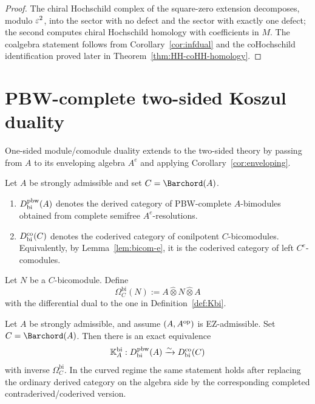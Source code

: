 \begin{proof}
The chiral Hochschild complex of the square-zero extension decomposes, modulo $\varepsilon^2$, into the sector with
no defect and the sector with exactly one defect; the second computes chiral Hochschild homology with
coefficients in $M$. The coalgebra statement follows from
Corollary~\ref{cor:infdual} and the coHochschild identification proved later in
Theorem~\ref{thm:HH-coHH-homology}.
\end{proof}

\section{PBW-complete two-sided Koszul duality}
\label{sec:bimod-bicomod}

One-sided module/comodule duality extends to the
two-sided theory by passing from $A$ to its enveloping algebra $A^e$ and applying
Corollary~\ref{cor:enveloping}.

\begin{definition}
Let $A$ be strongly admissible and set $C=\Barchord(A)$.
\begin{enumerate}[label=(\alph*)]
\item $D^{\mathrm{pbw}}_{\mathrm{bi}}(A)$ denotes the derived category of PBW-complete $A$-bimodules obtained
from complete semifree $A^e$-resolutions.

\item $D^{\mathrm{co}}_{\mathrm{bi}}(C)$ denotes the coderived category of conilpotent $C$-bicomodules.
Equivalently, by Lemma~\ref{lem:bicom-e}, it is the coderived category of left $C^e$-comodules.
\end{enumerate}
\end{definition}

\begin{definition}
Let $N$ be a $C$-bicomodule. Define
\[
\Omega_C^{\mathrm{bi}}(N):=A\widehat\otimes N\widehat\otimes A
\]
with the differential dual to the one in Definition~\ref{def:Kbi}.
\end{definition}

\begin{theorem}
\ClaimStatusProvedHere
\label{thm:bimod-bicomod}
Let $A$ be strongly admissible, and assume $(A,A^{\mathrm{op}})$ is EZ-admissible.
Set $C=\Barchord(A)$.
Then there is an exact equivalence
\[
\mathbb{K}_A^{\mathrm{bi}}:D^{\mathrm{pbw}}_{\mathrm{bi}}(A)\xrightarrow{\sim}D^{\mathrm{co}}_{\mathrm{bi}}(C)
\]
with inverse $\Omega_C^{\mathrm{bi}}$. In the curved regime the same statement holds after replacing
the ordinary derived category on the algebra side by the corresponding completed
contra\-derived/coderived version.
\end{theorem}

